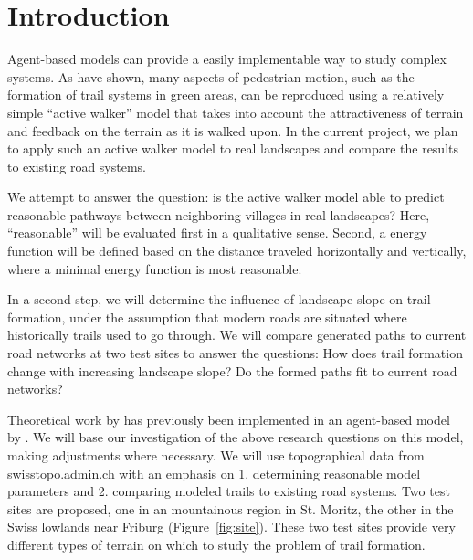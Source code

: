\documentclass[a4paper, DIV11, abstracton]{scrartcl}
\begin{document}
\section{Introduction}


Agent-based models can provide a easily implementable way to study complex systems. As \citet{helbing:1997} have shown, many aspects of pedestrian motion, such as the formation of trail systems in green areas, can be reproduced using a relatively simple ``active walker'' model that takes into account the attractiveness of terrain and feedback on the terrain as it is walked upon. In the current project, we plan to apply such an active walker model to real landscapes and compare the results to existing road systems.




We attempt to answer the question: is the active walker model able to predict reasonable pathways between neighboring villages in real landscapes? Here, ``reasonable'' will be evaluated first in a qualitative sense. Second, a energy function will be defined based on the distance traveled horizontally and vertically, where a minimal energy function is most reasonable.

In a second step, we will determine the influence of landscape slope on trail formation, under the assumption that modern roads are situated where historically trails used to go through. We will compare generated paths to current road networks at two test sites to answer the questions: How does trail formation change with increasing landscape slope? Do the formed paths fit to current road networks?

Theoretical work by \citet{helbing:1997} has previously been implemented in an agent-based model by \citet{trailsystems}. We will base our investigation of the above research questions on this model, making adjustments where necessary. We will use topographical data from swisstopo.admin.ch with an emphasis on 1. determining reasonable model parameters and 2. comparing modeled trails to existing road systems. Two test sites are proposed, one in an mountainous region in St. Moritz, the other in the Swiss lowlands near Friburg (Figure~\ref{fig:site}). These two test sites provide very different types of terrain on which to study the problem of trail formation.
\end{document}
